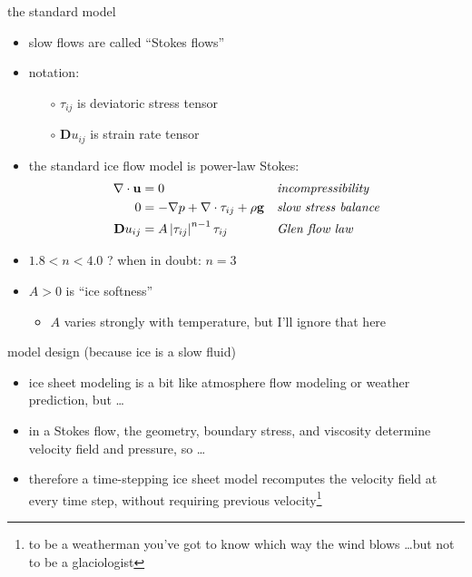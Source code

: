 \documentclass[hide notes,intlimits]{beamer}
\begin{document}
\begin{frame}{the standard model}

\begin{itemize}
\item slow flows are called ``Stokes flows''
\item notation:
  \begin{itemize}
  \item[$\circ$] $\tau_{ij}$ is deviatoric stress tensor
  \item[$\circ$] $\mathbf{D}u_{ij}$ is strain rate tensor
  \end{itemize}
\smallskip
\item the standard ice flow model is power-law Stokes:
\begin{align*}
\nabla \cdot \mathbf{u} &= 0 &&\text{\emph{incompressibility}} \\
0 &= - \nabla p + \nabla \cdot \tau_{ij} + \rho \mathbf{g} &&\text{\emph{slow stress balance}} \\
\mathbf{D}u_{ij} &= A \left|\tau_{ij}\right|^{n-1} \tau_{ij} &&\text{\emph{Glen flow law}}
\end{align*}
\item $1.8 < n < 4.0$ ?  \quad \alert{when in doubt: $n=3$}
\medskip
\item $A>0$ is ``ice softness''
   \begin{itemize}
   \item $A$ varies strongly with temperature, but I'll ignore that here
   \end{itemize}
\end{itemize}
\end{frame}


\begin{frame}{model design (because ice is a slow fluid)}

\begin{itemize}
\item ice sheet modeling is a bit like atmosphere flow modeling or weather prediction, but \dots
\item in a Stokes flow, the geometry, boundary stress, and viscosity determine velocity field and pressure, so \dots
\item therefore a time-stepping ice sheet model recomputes the velocity field at every time step, without requiring previous velocity\footnote{to be a weatherman you've got to know which way the wind blows \dots but not to be a glaciologist}
\end{itemize}
\end{frame}
\end{document}
